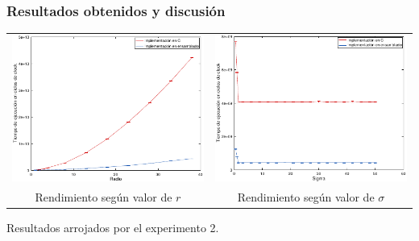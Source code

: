         \subsubsection*{Resultados obtenidos y discusión}
            \noindent{} \begin{minipage}{\textwidth}
                \begin{center}
                    \vspace{1em}
                    \begin{tabular}{cc}
                        \includegraphics{graficos/exp2-tiempo_segun_radio.pdf} & \includegraphics{graficos/exp2-tiempo_segun_sigma.pdf} \\
                        {\small Rendimiento según valor de $r$}                & {\small Rendimiento según valor de $\sigma$}
                        \vspace{1em}
                    \end{tabular}
                    Resultados arrojados por el experimento 2.
                \end{center}
            \end{minipage}

